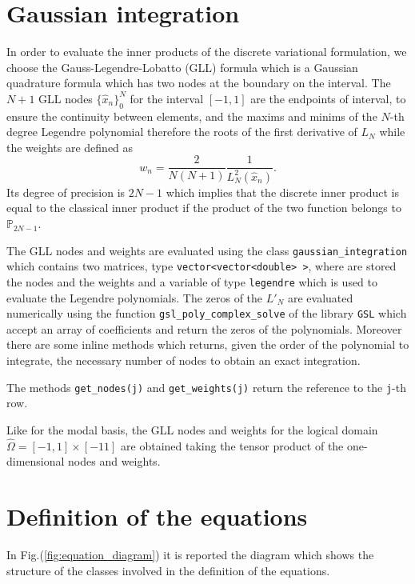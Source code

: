 \section{Gaussian integration}\label{sec:gaussian_integration}
In order to evaluate the inner products of the discrete variational formulation, we choose the Gauss-Legendre-Lobatto (GLL) formula which is a Gaussian quadrature formula which has two nodes at the boundary on the interval. The $N+1$ GLL nodes $\{\hat{x}_n\}_0^N$ for the interval $[-1,1]$ are the endpoints of interval, to ensure the continuity between elements, and the maxims and minims of the $N$-th degree Legendre polynomial therefore the roots of the first derivative of $L_N$ while the weights are defined as
\begin{equation}
  w_n=\frac{2}{N(N+1)}\frac{1}{L^2_N(\hat{x}_n)}.
\end{equation}
Its degree of precision is $2N-1$ which implies that the discrete inner product is equal to the classical inner product if the product of the two function belongs to $\mathbb{P}_{2N-1}$.
\medskip

The GLL nodes and weights are evaluated using the class \verb|gaussian_integration| which contains two matrices, type \verb|vector<vector<double> >|, where are stored the nodes and the weights and a variable of type \verb|legendre| which is used to evaluate the Legendre polynomials. The zeros of the $L'_N$ are evaluated numerically using the function \verb|gsl_poly_complex_solve| of the library \verb|GSL| which accept an array of coefficients and return the zeros of the polynomials. Moreover there are some inline methods which returns, given the order of the polynomial to integrate, the necessary number of nodes to obtain an exact integration.

The methods \verb|get_nodes(j)| and \verb|get_weights(j)| return the reference to the \verb|j|-th row.
\medskip

Like for the modal basis, the GLL nodes and weights for the logical domain $\hat{\Omega}=[-1,1]\times[-1 1]$ are obtained taking the tensor product of the one-dimensional nodes and weights.

\section{Definition of the equations}
In Fig.(\ref{fig:equation_diagram}) it is reported the diagram which shows the structure of the classes involved in the definition of the equations.

